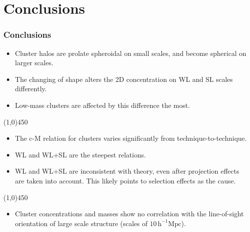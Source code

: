 \documentclass[hyperref={pdfpagelabels=false}]{beamer}
\begin{document}
\section{Conclusions}
\begin{frame}
\frametitle{Conclusions}
{\footnotesize
    \begin{itemize}
    \item Cluster halos are prolate spheroidal on small scales, and become
      spherical on larger scales.
    \item The changing of shape alters the 2D concentration on WL and SL scales
      differently. 
    \item Low-mass clusters are affected by this difference the most.
    \end{itemize}
}

    \begin{center}
      \line(1,0){450}
    \end{center}
{\footnotesize
    \begin{itemize}
    \item The c-M relation for clusters varies significantly from technique-to-technique.
    \item WL and WL+SL are the steepest relations.
    \item WL and WL+SL are inconsistent with theory, even after projection
      effects are taken into account. This likely points to selection effects
      as the cause.
    \end{itemize}
}

    \begin{center}
      \line(1,0){450}
    \end{center}
{\footnotesize
    \begin{itemize}
    \item Cluster concentrations and masses show no correlation with the line-of-sight
      orientation of large scale structure (scales of $\mathrm{10\,h^{-1}Mpc}$).
    \end{itemize}
}
\end{frame}
\end{document}
